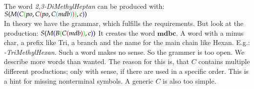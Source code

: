 \documentclass[a4paper,10pt]{article}
\newcommand{\gerquot}[1]{\glqq#1\grqq}
\newcommand{\colorBracketFirstNesting}{black}
\newcommand{\colorBracketSecondNesting}{blue}
\newcommand{\colorBracketThirdNesting}{green}
\newcommand{\colorBracketFourthNesting}{red}
\newcommand{\colorBracketFifthNesting}{cyan}
\begin{document}
\noindent The word \emph{2,3-DiMethylHeptan} can be produced with:
$
S
{\color{\colorBracketFirstNesting}{(}}
    M
    {\color{\colorBracketSecondNesting}{(}}
        C
        {\color{\colorBracketThirdNesting}{(}}
            po,
            C
            {\color{\colorBracketFourthNesting}{(}}
                po,
                C
                {\color{\colorBracketFifthNesting}{(}}
                    mdb
                {\color{\colorBracketFifthNesting}{)}}
            {\color{\colorBracketFourthNesting}{)}}
        {\color{\colorBracketThirdNesting}{)}}
        , c
    {\color{\colorBracketSecondNesting}{)}}
{\color{\colorBracketFirstNesting}{)}}
$\\


In theory we have the grammar, which fulfills the requirements. But look at the production:
$
S
{\color{\colorBracketFirstNesting}{(}}
    M
    {\color{\colorBracketSecondNesting}{(}}
        B
        {\color{\colorBracketThirdNesting}{(}}
            C
            {\color{\colorBracketFourthNesting}{(}}
                mdb
            {\color{\colorBracketFourthNesting}{)}}
        {\color{\colorBracketThirdNesting}{)}}
        , c
    {\color{\colorBracketSecondNesting}{)}}
{\color{\colorBracketFirstNesting}{)}}
$
It creates the word $\textbf{mdbc}$. A word with a minus char, a prefix like \gerquot{Tri}, a branch and the name for the main chain like \gerquot{Hexan}. E.g.: \emph{-TriMethylHexan}. Such a word makes no sense. So the grammer is too open. We describe more words than wanted. The reason for this is, that $C$ contains multiple different productions; only with sense, if there are used in a specific order. This is a hint for missing nonterminal symbols. A generic $C$ is also too simple.
\end{document}
